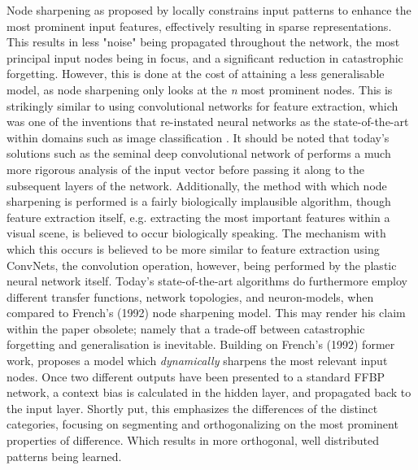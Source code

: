 Node sharpening as proposed by \cite{French1992} locally constrains input patterns to enhance the most prominent input features, effectively resulting in sparse representations. This results in less "noise" being propagated throughout the network, the most principal input nodes being in focus, and a significant reduction in catastrophic forgetting. However, this is done at the cost of attaining a less generalisable model, as node sharpening only looks at the \textit{n} most prominent nodes. This is strikingly similar to using convolutional networks for feature extraction, which was one of the inventions that re-instated neural networks as the state-of-the-art within domains such as image classification \citep{LeCun2015}. It should be noted that today's solutions such as the seminal deep convolutional network of \cite{Krizhevsky2012} performs a much more rigorous analysis of the input vector before passing it along to the subsequent layers of the network. Additionally, the method with which node sharpening is performed is a fairly biologically implausible algorithm, though feature extraction itself, e.g. extracting the most important features within a visual scene, is believed to occur biologically speaking. The mechanism with which this occurs is believed to be more similar to feature extraction using ConvNets, the convolution operation, however, being performed by the plastic neural network itself.
Today's state-of-the-art algorithms do furthermore employ different transfer functions, network topologies, and neuron-models, when compared to French's (1992) node sharpening model. This may render his claim within the paper obsolete; namely that a trade-off between catastrophic forgetting and generalisation is inevitable.
Building on French's (1992) former work, \cite{French1994} proposes a model which \textit{dynamically} sharpens the most relevant input nodes. Once two different outputs have been presented to a standard FFBP network, a context bias is calculated in the hidden layer, and propagated back to the input layer. Shortly put, this emphasizes the differences of the distinct categories, focusing on segmenting and orthogonalizing on the most prominent properties of difference. Which results in more orthogonal, well distributed patterns being learned.
